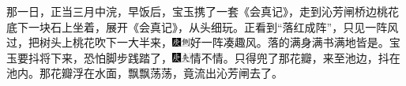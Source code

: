 那一日，正当三月中浣，早饭后，宝玉携了一套《会真记》，走到沁芳闸桥边桃花底下一块石上坐着，展开《会真记》，从头细玩。正看到“落红成阵”，只见一阵风过，把树头上桃花吹下一大半来，{\includegraphics[width=3mm]{../Images/00004}\includegraphics[width=3mm]{../Images/00011}\footnotesize \kaishu 好一阵凑趣风。}落的满身满书满地皆是。宝玉要抖将下来，恐怕脚步践踏了，{\includegraphics[width=3mm]{../Images/00004}\includegraphics[width=3mm]{../Images/00012}\footnotesize \kaishu 情不情。}只得兜了那花瓣，来至池边，抖在池内。那花瓣浮在水面，飘飘荡荡，竟流出沁芳闸去了。

